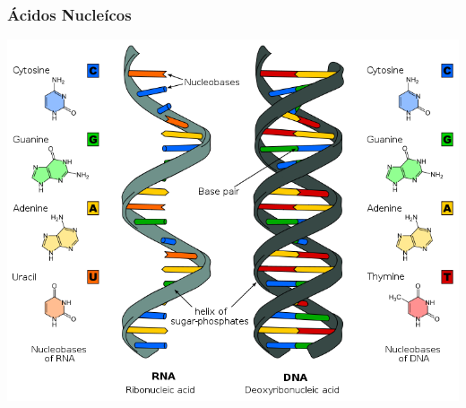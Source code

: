     \begin{frame}\frametitle{\textbf{Ácidos Nucleícos}}
      \begin{block}{}
        \begin{center}
          \includegraphics[scale=.3]{images/adnrna.png}
        \end{center}
      \end{block}
    \end{frame}

